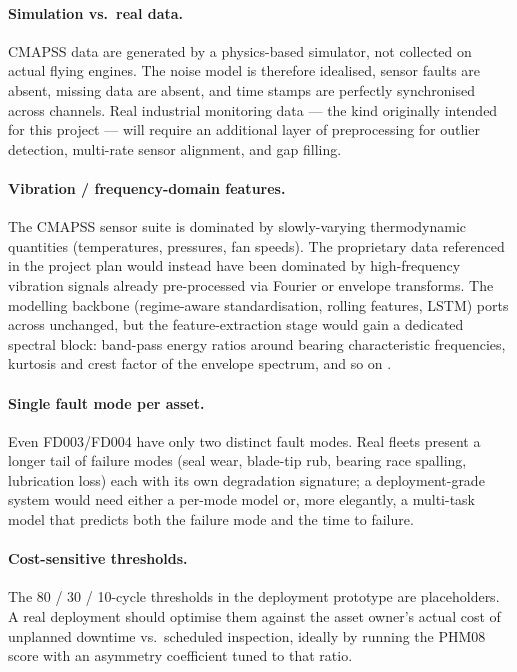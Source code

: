 \documentclass[11pt,letterpaper]{article}
\begin{document}
\paragraph{Simulation vs.\ real data.} CMAPSS data are generated by a
physics-based simulator, not collected on actual flying engines. The
noise model is therefore idealised, sensor faults are absent, missing
data are absent, and time stamps are perfectly synchronised across
channels. Real industrial monitoring data --- the kind originally
intended for this project --- will require an additional layer of
preprocessing for outlier detection, multi-rate sensor alignment, and
gap filling.

\paragraph{Vibration / frequency-domain features.} The CMAPSS sensor
suite is dominated by slowly-varying thermodynamic quantities
(temperatures, pressures, fan speeds). The proprietary data referenced
in the project plan would instead have been dominated by high-frequency
vibration signals already pre-processed via Fourier or envelope
transforms. The modelling backbone (regime-aware standardisation,
rolling features, LSTM) ports across unchanged, but the feature-extraction
stage would gain a dedicated spectral block: band-pass energy ratios
around bearing characteristic frequencies, kurtosis and crest factor of
the envelope spectrum, and so on \citep{randall2011vibration}.

\paragraph{Single fault mode per asset.} Even FD003/FD004 have only two
distinct fault modes. Real fleets present a longer tail of failure
modes (seal wear, blade-tip rub, bearing race spalling, lubrication
loss) each with its own degradation signature; a deployment-grade
system would need either a per-mode model or, more elegantly, a
multi-task model that predicts both the failure mode and the time to
failure.

\paragraph{Cost-sensitive thresholds.} The 80 / 30 / 10-cycle
thresholds in the deployment prototype are placeholders. A real
deployment should optimise them against the asset owner's actual cost
of unplanned downtime vs.\ scheduled inspection, ideally by running the
PHM08 score with an asymmetry coefficient tuned to that ratio.
\end{document}
